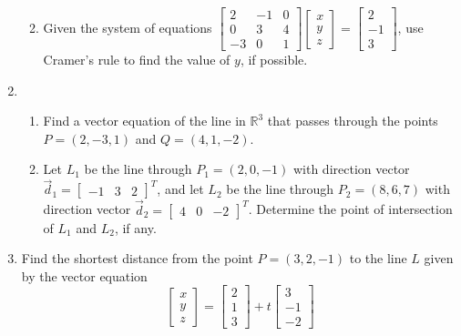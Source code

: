 \documentclass[12pt]{article}
\newcommand{\points}[1]{\marginpar{\hspace{24pt}[#1]}}
\newcommand{\R}{\mathbb{R}}
\begin{document}
\begin{enumerate}
\begin{enumerate}
\vspace{3.5in}

 \item Given the system of equations $\begin{bmatrix}2&-1&0\\0&3&4\\-3&0&1\end{bmatrix}\begin{bmatrix}x\\y\\z\end{bmatrix} =\begin{bmatrix}2\\-1\\3\end{bmatrix}$, use Cramer's rule to find the value of $y$, if possible. \points{5}
\end{enumerate}


\newpage

\item \begin{enumerate}
       \item Find a vector equation of the line in $\R^3$ that passes through the points $P=(2,-3,1)$ and $Q=(4,1,-2)$. \points{4}

\vspace{2.5in}

       \item Let $L_1$ be the line through $P_1=(2,0,-1)$ with direction vector $\vec{d}_1 = \begin{bmatrix}-1&3&2\end{bmatrix}^T$, and let $L_2$ be the line through $P_2=(8,6,7)$ with direction vector $\vec{d}_2=\begin{bmatrix}4&0&-2\end{bmatrix}^T$. Determine the point of intersection of $L_1$ and $L_2$, if any.\points{6}
      \end{enumerate}




\newpage
\item Find the shortest distance from the point $P=(3,2,-1)$ to the line $L$ given by the vector equation \points{5}
\[
\begin{bmatrix}x\\y\\z\end{bmatrix} = \begin{bmatrix}2\\1\\3\end{bmatrix} + t\begin{bmatrix}3\\-1\\-2\end{bmatrix}
\]


\end{enumerate}
\end{document}
